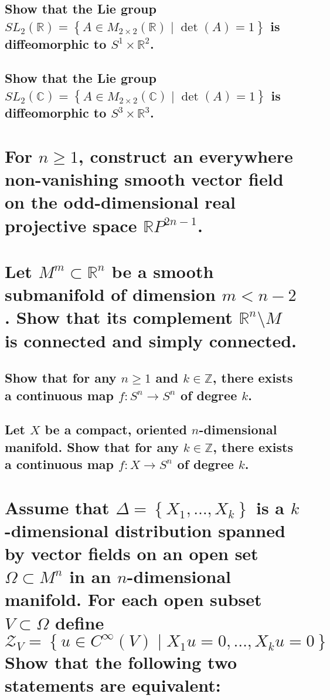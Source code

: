 \documentclass[10pt]{article}
\newcommand{\advsection}{\addtocounter{section}{1} \setcounter{subsection}{0}}
\begin{document}
 

\advsection{}

\subsection{Show that the Lie group $SL_2(\mathbb{R}) = \left\{ A \in M_{2 \times2}(\mathbb{R})
    \mid\det (A) = 1 \right\} $ is diffeomorphic to $S^1 \times \mathbb{R}^2$.}

\subsection{Show that the Lie group $SL_2(\mathbb{C}) = \left\{ A \in M_{2 \times 2} (\mathbb{C})
    \mid \det (A)= 1 \right\} $ is diffeomorphic to $S^3 \times \mathbb{R}^3$.}

\section{For $n \geq 1 $, construct an everywhere non-vanishing smooth vector field on the
  odd-dimensional real projective space $\mathbb{R} P^{2n-1}$.}

\section{Let $M^m \subset \mathbb{R}^n$ be a smooth submanifold of dimension $m < n-2$. Show that
  its complement $\mathbb{R}^n \setminus M$ is connected and simply connected.}

\advsection{}

\subsection{Show that for any $n \geq 1$ and $k \in \mathbb{Z}$, there exists a continuous map $f:
  S^n \to S^n$ of degree $k$.}

\subsection{Let $X$ be a compact, oriented $n$-dimensional manifold. Show that for any $k \in \mathbb{Z}$, there
  exists a continuous map $f : X \to S^n$ of degree $k$.}

\section{Assume that $\Delta = \left\{ X_1, \dots, X_k \right\} $ is a $k$-dimensional distribution
  spanned by vector fields on an open set $\Omega \subset M^n$ in an $n$-dimensional manifold. For
  each open subset $V \subset \Omega$ define
  $$ \mathcal{Z}_V = \left\{ u \in C^\infty (V) \mid X_1 u = 0, \dots, X_k u =0 \right\} $$
  Show that the following two statements are equivalent:}
\end{document}
